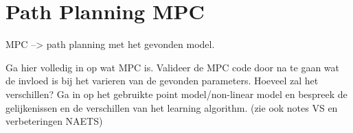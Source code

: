 \chapter{Path Planning MPC}
\label{cha:planning_MPC}

MPC --> path planning met het gevonden model.

Ga hier volledig in op wat MPC is.
Valideer de MPC code door na te gaan wat de invloed is bij het varieren van de gevonden parameters.
Hoeveel zal het verschillen? Ga in op het gebruikte point model/non-linear model en bespreek de gelijkenissen en de verschillen van het learning algorithm. (zie ook notes VS en verbeteringen NAETS)















